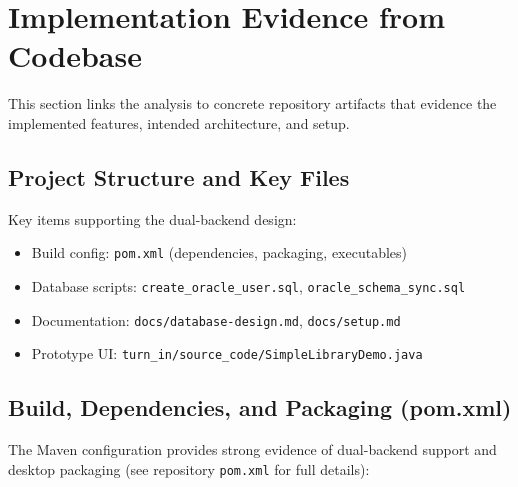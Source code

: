 \documentclass[12pt,a4paper]{article}
\newcommand{\file}[1]{\texttt{#1}}
\begin{document}
\section{Implementation Evidence from Codebase}

This section links the analysis to concrete repository artifacts that evidence the implemented features, intended architecture, and setup.

\subsection{Project Structure and Key Files}

Key items supporting the dual-backend design:
\begin{itemize}
    \item Build config: \file{pom.xml} (dependencies, packaging, executables)
    \item Database scripts: \file{create\_oracle\_user.sql}, \file{oracle\_schema\_sync.sql}
    \item Documentation: \file{docs/database-design.md}, \file{docs/setup.md}
    \item Prototype UI: \file{turn\_in/source\_code/SimpleLibraryDemo.java}
\end{itemize}

\subsection{Build, Dependencies, and Packaging (pom.xml)}

The Maven configuration provides strong evidence of dual-backend support and desktop packaging (see repository \file{pom.xml} for full details):
\end{document}
